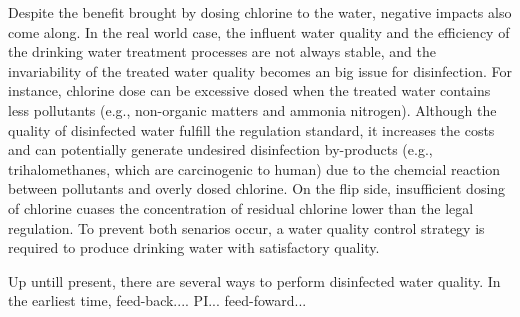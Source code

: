 Despite the benefit brought by dosing chlorine to the water, negative impacts also come along. In the real world case, the influent water quality and the efficiency of the drinking water treatment processes are not always stable, and the invariability of the treated water quality becomes an big issue for disinfection. For instance, chlorine dose can be excessive dosed when the treated water contains less pollutants (e.g., non-organic matters and ammonia nitrogen). Although the quality of disinfected water fulfill the regulation standard, it increases the costs and can potentially generate undesired disinfection by-products (e.g., trihalomethanes, which are carcinogenic to human) due to the chemcial reaction between pollutants and overly dosed chlorine. On the flip side, insufficient dosing of chlorine cuases the concentration of residual chlorine lower than the legal regulation. To prevent both senarios occur, a water quality control strategy is required to produce drinking water with satisfactory quality. 

Up untill present, there are several ways to perform disinfected water quality. In the earliest time, feed-back.... PI... feed-foward...


